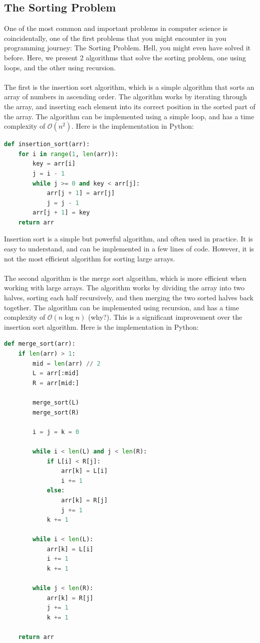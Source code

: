 \documentclass[openany]{book}
\begin{document}
\subsection{The Sorting Problem}
One of the most common and important problems in computer science is coincidentally, one of the first problems that you might encounter in you programming journey: The Sorting Problem. Hell, you might even have solved it before. Here, we present 2 algorithms that solve the sorting problem, one using loops, and the other using recursion. \\ \\
The first is the insertion sort algorithm, which is a simple algorithm that sorts an array of numbers in ascending order. The algorithm works by iterating through the array, and inserting each element into its correct position in the sorted part of the array. The algorithm can be implemented using a simple loop, and has a time complexity of \(\mathcal{O}(n^2)\). Here is the implementation in Python:
\begin{lstlisting}[language=Python]
def insertion_sort(arr):
    for i in range(1, len(arr)):
        key = arr[i]
        j = i - 1
        while j >= 0 and key < arr[j]:
            arr[j + 1] = arr[j]
            j = j - 1
        arr[j + 1] = key
    return arr
\end{lstlisting}
Insertion sort is a simple but powerful algorithm, and often used in practice. It is easy to understand, and can be implemented in a few lines of code. However, it is not the most efficient algorithm for sorting large arrays. \\ \\
The second algorithm is the merge sort algorithm, which is more efficient when working with large arrays. The algorithm works by dividing the array into two halves, sorting each half recursively, and then merging the two sorted halves back together. The algorithm can be implemented using recursion, and has a time complexity of \(\mathcal{O}(n \log n)\) (why?). This is a significant improvement over the insertion sort algorithm.  Here is the implementation in Python:
\begin{lstlisting}[language=Python]
def merge_sort(arr): 
    if len(arr) > 1:
        mid = len(arr) // 2
        L = arr[:mid]
        R = arr[mid:]

        merge_sort(L)
        merge_sort(R)

        i = j = k = 0

        while i < len(L) and j < len(R):
            if L[i] < R[j]:
                arr[k] = L[i]
                i += 1
            else:
                arr[k] = R[j]
                j += 1
            k += 1

        while i < len(L):
            arr[k] = L[i]
            i += 1
            k += 1

        while j < len(R):
            arr[k] = R[j]
            j += 1
            k += 1

    return arr
\end{lstlisting}
\end{document}
